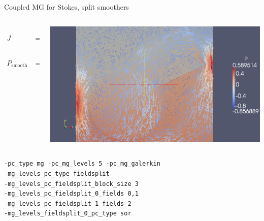 \begin{frame}[fragile]{Coupled MG for Stokes, split smoothers}
\begin{columns}
  \begin{column}{0.3\textwidth}
    \begin{align*}
      J &=
      \begin{pmatrix}
        A & B^T \\ B & C
      \end{pmatrix} \\
      P_{\text{smooth}} &=
      \begin{pmatrix}
        A_{\text{SOR}} & 0 \\
        B & M
      \end{pmatrix}
    \end{align*}
  \end{column}
  \begin{column}{0.7\textwidth}
    \includegraphics[width=\textwidth]{figures/Sinker2}
  \end{column}
\end{columns}
\begin{Verbatim}[formatcom=\footnotesize]
-pc_type mg -pc_mg_levels 5 -pc_mg_galerkin
-mg_levels_pc_type fieldsplit
-mg_levels_pc_fieldsplit_block_size 3
-mg_levels_pc_fieldsplit_0_fields 0,1
-mg_levels_pc_fieldsplit_1_fields 2
-mg_levels_fieldsplit_0_pc_type sor
\end{Verbatim}
\end{frame}
